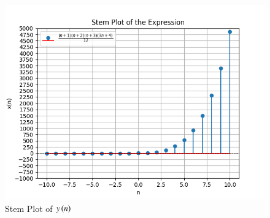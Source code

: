\documentclass[journal,12pt,twocolumn]{IEEEtran}
\theoremstyle{remark}
\begin{document}
\begin{enumerate}[label=\arabic*.]
\begin{figure}[h]
    \includegraphics[width=1\columnwidth]{Figure_2.png}
    \caption{Stem Plot of $y\left(n\right)$}
\end{figure}


\end{enumerate}
\end{document}
